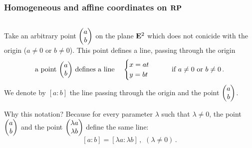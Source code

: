 \documentclass[12pt]{article}
\numberwithin{equation}{section}
\begin{document}
\subsubsection {Homogeneous and affine coordinates on ${\bf R}{\bf P}$}


    \begin{equation*}
     \end{equation*} 



Take an arbitrary point $\begin{pmatrix}a\cr b\cr\end{pmatrix}$ 
on the plane ${\bf E}^2$
which does not conicide with the origin ($a\not=0$ or $b\not=0$).
 This point defines a line, passing through the origin
            \begin{equation*}
 \hbox {a point $\begin{pmatrix}a\cr b\cr\end{pmatrix}$ 
defines a line}\,\quad
      \begin{cases} x=at\cr y=bt\cr\end{cases}
        \qquad \hbox {if $a\not=0$ or $b\not=0$}\,.
             \end{equation*}
We denote by $[a:b]$ the line passing through the origin 
and the point
$\begin{pmatrix}a\cr b\cr\end{pmatrix}$.

Why this notation? 
Because for every parameter $\lambda$ such that $\lambda\not=0$,
the point  $\begin{pmatrix}a\cr b\cr\end{pmatrix}$
and the point $\begin{pmatrix}\lambda a\cr \lambda b\cr\end{pmatrix}$
define the same line:
              $$
    [a:b]=[\lambda a:\lambda b]\,,\,\,(\lambda\not=0)\,.
              $$
     
\end{document}
